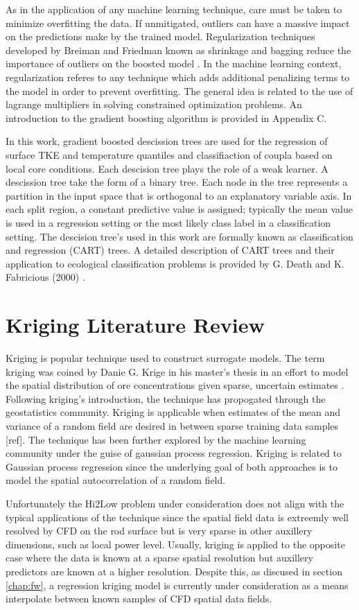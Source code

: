 As in the application of any machine learning technique, care must be taken to minimize overfitting the data.  If unmitigated, outliers can have a massive impact on the predictions make by the trained model.  Regularization techniques developed by Breiman and Friedman known as shrinkage and bagging reduce the importance of outliers on the boosted model \cite{breiman1996}.  In the machine learning context, regularization referes to any technique which adds additional penalizing terms to the model in order to prevent overfitting.  The general idea is related to the use of lagrange multipliers in solving constrained optimization problems.  An introduction to the gradient boosting algorithm is provided in Appendix C.

In this work, gradient boosted descission trees are used for the regression of surface TKE and temperature quantiles and classifiaction of coupla based on local core conditions.   Each descision tree plays the role of a weak learner.  A descission tree take the form of a binary tree.  Each node in the tree represents a partition in the input space that is orthogonal to an explanatory variable axis.  In each split region, a constant predictive value is assigned; typically the mean value is used in a regression setting or the most likely class label in a classification setting.  The descision tree's used in this work are formally known as classification and regression (CART) trees.  A detailed description of CART trees and their application to ecological classification problems is provided by G. Death and K. Fabricious (2000) \cite{death2000}. 

\section{Kriging Literature Review}

Kriging is popular technique used to construct surrogate models.
The term kriging was coined by Danie G. Krige in his master's thesis in an effort to model the spatial distribution of ore concentrations given sparse, uncertain estimates \cite{krige51}. Following kriging's introduction, the technique has propogated through the geostatistics community.  Kriging is applicable when estimates of the mean and variance of a random field are desired in between sparse training data samples [ref].  The technique has been further explored by the machine learning community under the guise of gaussian process regression.  Kriging is related to Gaussian process regression since the underlying goal of both approaches is to model the spatial autocorrelation of a random field.  

Unfortunately the Hi2Low problem under consideration does not align with the typical applications of the technique since the spatial field data is extreemly well resolved by CFD on the rod surface but is very sparse in other auxillery dimensions, such as local power level.  Usually, kriging is applied to the opposite case where the data is known at a sparse spatial resolution but auxillery predictors are known at a higher resolution.  Despite this, as discused in section \ref{chap:fw}, a regression kriging model is currently under consideration as a means interpolate between known samples of CFD spatial data fields.  

